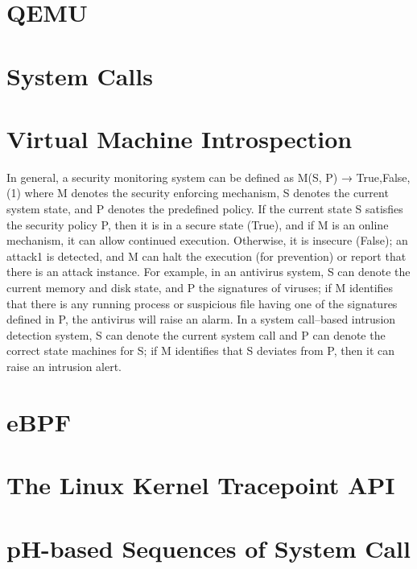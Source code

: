 \documentclass{report}
\begin{document}
\begin{spacing}{1.5}
\section{QEMU}
\section{System Calls}
\section{Virtual Machine Introspection}

In general, a security monitoring system can be defined as
M(S, P) → {True,False}, (1)
where M denotes the security enforcing mechanism, S denotes the current system
state, and P denotes the predefined policy. If the current state S satisfies the security
policy P, then it is in a secure state (True), and if M is an online mechanism, it can
allow continued execution. Otherwise, it is insecure (False); an attack1 is detected, and
M can halt the execution (for prevention) or report that there is an attack instance.
For example, in an antivirus system, S can denote the current memory and disk state,
and P the signatures of viruses; if M identifies that there is any running process or
suspicious file having one of the signatures defined in P, the antivirus will raise an
alarm. In a system call–based intrusion detection system, S can denote the current
system call and P can denote the correct state machines for S; if M identifies that
S deviates from P, then it can raise an intrusion alert.


\section{eBPF}
\section{The Linux Kernel Tracepoint API}
\section{pH-based Sequences of System Call}



{\large


}
\end{spacing}
\end{document}
